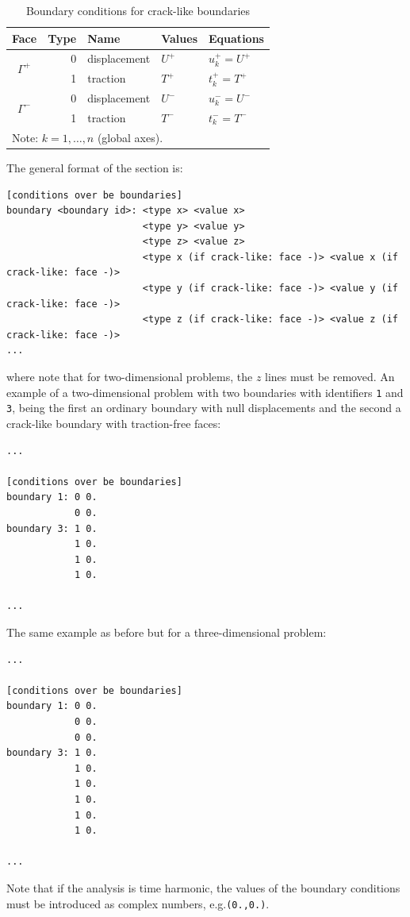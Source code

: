 \documentclass[a4paper,fleqn]{book}
\begin{document}
\begin{table}
\centering
{\footnotesize
\begin{tabular}{crlll}
\textbf{Face} & \textbf{Type} & \textbf{Name} & \textbf{Values} & \textbf{Equations} \\
\midrule
\multirow{2}{*}{$\Gamma^+$} & 0 & displacement & $U^+$ & $u_k^+=U^+$ \\
\cline{2-5}
                            & 1 & traction     & $T^+$ & $t_k^+=T^+$ \\
\hline
\multirow{2}{*}{$\Gamma^-$} & 0 & displacement & $U^-$ & $u_k^-=U^-$ \\
\cline{2-5}
                            & 1 & traction     & $T^-$ & $t_k^-=T^-$ \\
\midrule
\multicolumn{5}{l}{Note: $k=1,\ldots,n$ (global axes).} \\
\end{tabular}
}
\caption{Boundary conditions for crack-like boundaries}
\label{tab:bc_crack_viscoelastic}
\end{table}

The general format of the section is:
\begin{Verbatim}[frame=single, fontsize=\small, label={general format of section [symmetry planes]}]
[conditions over be boundaries]
boundary <boundary id>: <type x> <value x>
                        <type y> <value y>
                        <type z> <value z>
                        <type x (if crack-like: face -)> <value x (if crack-like: face -)>
                        <type y (if crack-like: face -)> <value y (if crack-like: face -)>
                        <type z (if crack-like: face -)> <value z (if crack-like: face -)>
...
\end{Verbatim} 
where note that for two-dimensional problems, the $z$ lines must be removed. An example of a two-dimensional problem with two boundaries with identifiers \texttt{1} and \texttt{3}, being the first an ordinary boundary with null displacements and the second a crack-like boundary with traction-free faces:
\begin{Verbatim}[frame=single, fontsize=\small, label={input.dat}]
...

[conditions over be boundaries]
boundary 1: 0 0.
            0 0.
boundary 3: 1 0.
            1 0.
            1 0.
            1 0.
            
...
\end{Verbatim} 
The same example as before but for a three-dimensional problem:
\begin{Verbatim}[frame=single, fontsize=\small, label={input.dat}]
...

[conditions over be boundaries]
boundary 1: 0 0.
            0 0.
            0 0.
boundary 3: 1 0.
            1 0.
            1 0.
            1 0.
            1 0.
            1 0.
            
...
\end{Verbatim} 
Note that if the analysis is time harmonic, the values of the boundary conditions must be introduced as complex numbers, e.g.\texttt{(0.,0.)}.
\end{document}
